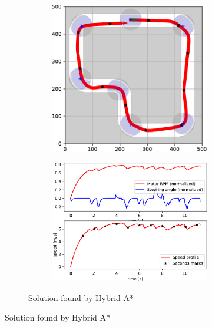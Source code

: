 \begin{figure}[!tbp]%
	\centering

	\begin{subfigure}[t]{\textwidth}
		\begin{subfigure}[c]{0.54\textwidth}
			\includegraphics[width=\textwidth]{../img/experiments/simple-hybrid_astar-trajectory}
		\end{subfigure}
		\hfill
		\begin{subfigure}[c]{0.45\textwidth}
			\includegraphics[width=\textwidth]{../img/experiments/simple-hybrid_astar-actuators}
		\end{subfigure}
		\caption{Solution found by Hybrid A*}
		\label{fig:simple-hybrid_astar}
	\end{subfigure}


\end{figure}
